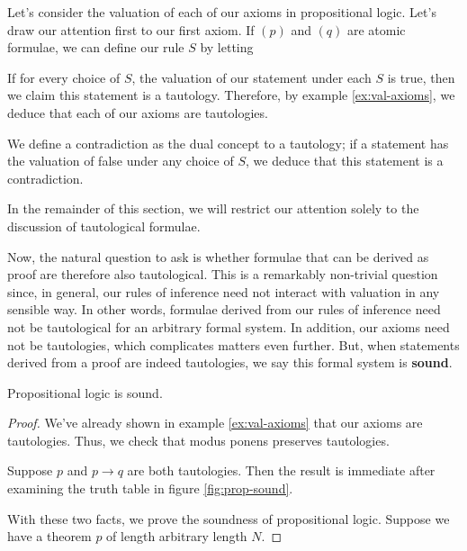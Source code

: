 \begin{ex}
	Let's consider the valuation of each of our axioms in propositional logic.
	Let's draw our attention first to our first axiom. If $(p)$ and $(q)$ are atomic formulae, we can define our rule $S$ by letting
	\label{ex:val-axioms}
\end{ex}

If for every choice of $S$, the valuation of our statement under each $S$ is true, then we claim this statement is a tautology.
Therefore, by example \eqref{ex:val-axioms}, we deduce that each of our axioms are tautologies.

We define a contradiction as the dual concept to a tautology; if a statement has the valuation of false under any choice of $S$, we deduce that this statement is a contradiction.

In the remainder of this section, we will restrict our attention solely to the discussion of tautological formulae.

Now, the natural question to ask is whether formulae that can be derived as proof are therefore also tautological.
This is a remarkably non-trivial question since, in general, our rules of inference need not interact with valuation in any sensible way.
In other words, formulae derived from our rules of inference need not be tautological for an arbitrary formal system.
In addition, our axioms need not be tautologies, which complicates matters even further.
But, when statements derived from a proof are indeed tautologies, we say this formal system is \textbf{sound}.

\begin{thm}
	Propositional logic is sound.	
\end{thm}
\begin{proof}
	We've already shown in example \eqref{ex:val-axioms} that our axioms are tautologies.
	Thus, we check that modus ponens preserves tautologies.
	
	Suppose $p$ and $p \to q$ are both tautologies.
	Then the result is immediate after examining the truth table in figure \eqref{fig:prop-sound}.
	
	With these two facts, we prove the soundness of propositional logic.
	Suppose we have a theorem $p$ of length arbitrary length $N$.
	
\end{proof}







